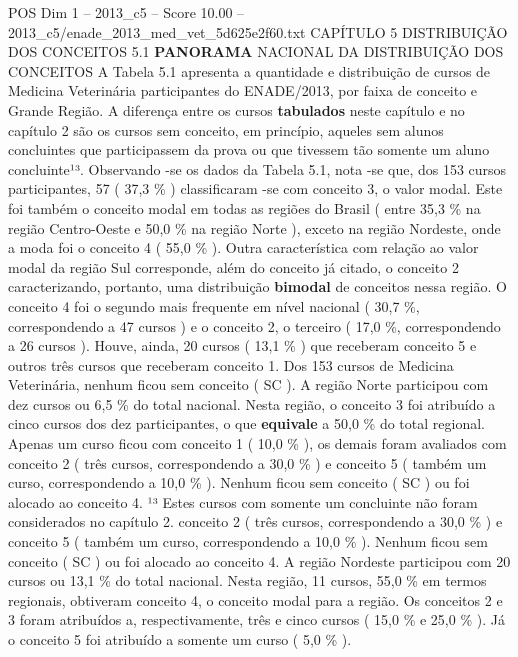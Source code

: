 \begin{textsample}{POS Dim 1 – 2013\_c5 – Score 10.00 – 2013\_c5/enade\_2013\_med\_vet\_5d625e2f60.txt}  \label{ex:f1_pos_084}
CAPÍTULO 5 DISTRIBUIÇÃO DOS CONCEITOS 5.1 \textbf{PANORAMA} NACIONAL DA DISTRIBUIÇÃO DOS CONCEITOS A Tabela 5.1 apresenta a quantidade e distribuição de cursos de Medicina Veterinária participantes do ENADE/2013, por faixa de conceito e Grande Região.
A diferença entre os cursos \textbf{tabulados} neste capítulo e no capítulo 2 são os cursos sem conceito, em princípio, aqueles sem alunos concluintes que participassem da prova ou que tivessem tão somente um aluno concluinte¹³.
Observando -se os dados da Tabela 5.1, nota -se que, dos 153 cursos participantes, 57 ( 37,3 \% ) classificaram -se com conceito 3, o valor modal.
Este foi também o conceito modal em todas as regiões do Brasil ( entre 35,3 \% na região Centro-Oeste e 50,0 \% na região Norte ), exceto na região Nordeste, onde a moda foi o conceito 4 ( 55,0 \% ).
Outra característica com relação ao valor modal da região Sul corresponde, além do conceito já citado, o conceito 2 caracterizando, portanto, uma distribuição \textbf{bimodal} de conceitos nessa região.
O conceito 4 foi o segundo mais frequente em nível nacional ( 30,7 \%, correspondendo a 47 cursos ) e o conceito 2, o terceiro ( 17,0 \%, correspondendo a 26 cursos ).
Houve, ainda, 20 cursos ( 13,1 \% ) que receberam conceito 5 e outros três cursos que receberam conceito 1.
Dos 153 cursos de Medicina Veterinária, nenhum ficou sem conceito ( SC ).
A região Norte participou com dez cursos ou 6,5 \% do total nacional.
Nesta região, o conceito 3 foi atribuído a cinco cursos dos dez participantes, o que \textbf{equivale} a 50,0 \% do total regional.
Apenas um curso ficou com conceito 1 ( 10,0 \% ), os demais foram avaliados com conceito 2 ( três cursos, correspondendo a 30,0 \% ) e conceito 5 ( também um curso, correspondendo a 10,0 \% ).
Nenhum ficou sem conceito ( SC ) ou foi alocado ao conceito 4. ¹³ Estes cursos com somente um concluinte não foram considerados no capítulo 2. conceito 2 ( três cursos, correspondendo a 30,0 \% ) e conceito 5 ( também um curso, correspondendo a 10,0 \% ).
Nenhum ficou sem conceito ( SC ) ou foi alocado ao conceito 4.
A região Nordeste participou com 20 cursos ou 13,1 \% do total nacional.
Nesta região, 11 cursos, 55,0 \% em termos regionais, obtiveram conceito 4, o conceito modal para a região.
Os conceitos 2 e 3 foram atribuídos a, respectivamente, três e cinco cursos ( 15,0 \% e 25,0 \% ).
Já o conceito 5 foi atribuído a somente um curso ( 5,0 \% ).

\end{textsample}
